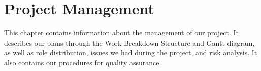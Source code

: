 \chapter{Project Management}
This chapter contains information about the management of our project. It describes our plans through the Work Breakdown Structure and Gantt diagram, as well as role distribution, issues we had during the project, and risk analysis. It also contains our procedures for quality assurance.


